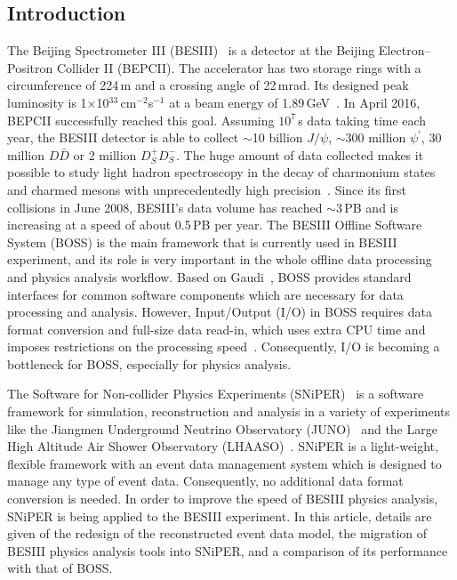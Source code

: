 \documentclass[a4paper,10pt,twoside]{cpc-hepnp}
\begin{document}
\begin{CJK*}{GB}{gbsn}
\begin{multicols}{2}


\section{Introduction}

The Beijing Spectrometer III (BESIII)~\cite{2009NIMPA.598....7B} is a detector at the Beijing Electron--Positron Collider II (BEPCII).
The accelerator has two storage rings with a circumference of 224\,m and a crossing angle of 22\,mrad.
Its designed peak luminosity is 1$\times$10$^{33}$\,cm$^{-2}$s$^{-1}$ at a beam energy of 1.89\,GeV~\cite{2009NIMPA.598....7B}.
In April 2016, BEPCII successfully reached this goal.
Assuming $10^{7}$\,s data taking time each year, the BESIII detector is able to collect $\sim$10 billion $J/\psi$, $\sim$300 million $\psi^\prime$, 30 million $D\bar{D}$ or 2 million $D^+_SD^-_S$.
The huge amount of data collected makes it possible to study light hadron spectroscopy in the decay of charmonium states and charmed mesons with unprecedentedly high precision~\cite{2008arXiv0809.1869A}.
Since its first collisions in June 2008, BESIII's data volume has reached $\sim$3\,PB and is increasing at a speed of about 0.5\,PB per year.
The BESIII Offline Software System (BOSS) is the main framework that is currently used in BESIII experiment, and its role is very important in the whole offline data processing and physics analysis workflow.
Based on Gaudi~\cite{2001CoPhC.140...45B}, BOSS provides standard interfaces for common software components which are necessary for data processing and analysis. However, Input/Output (I/O) in BOSS requires data format conversion and full-size data read-in, which uses extra CPU time and imposes restrictions on the processing speed~\cite{proc-disc-2006}.
Consequently, I/O is becoming a bottleneck for BOSS, especially for physics analysis.

The Software for Non-collider Physics Experiments (SNiPER)~\cite{sniper} is a software framework for simulation, reconstruction and analysis in a variety of experiments like the Jiangmen Underground Neutrino Observatory (JUNO)~\cite{2016JPhG...43c0401A} and the Large High Altitude Air Shower Observatory (LHAASO)~\cite{2016arXiv160207600D}.
SNiPER is a light-weight, flexible framework with an event data management system which is designed to manage any type of event data. Consequently, no additional data format conversion is needed.
In order to improve the speed of BESIII physics analysis, SNiPER is being applied to the BESIII experiment. 
In this article, details are given of the redesign of the reconstructed event data model, the migration of BESIII physics analysis tools into SNiPER, and a comparison of its performance with that of BOSS.



\end{multicols}
\end{CJK*}
\end{document}

